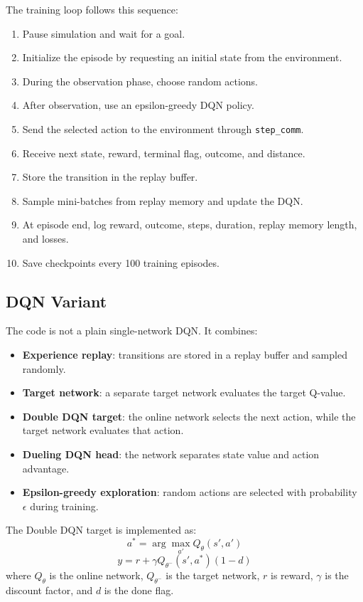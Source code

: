 \documentclass[11pt,a4paper]{article}
\begin{document}
The training loop follows this sequence:
\begin{enumerate}[noitemsep]
    \item Pause simulation and wait for a goal.
    \item Initialize the episode by requesting an initial state from the environment.
    \item During the observation phase, choose random actions.
    \item After observation, use an epsilon-greedy DQN policy.
    \item Send the selected action to the environment through \texttt{step\_comm}.
    \item Receive next state, reward, terminal flag, outcome, and distance.
    \item Store the transition in the replay buffer.
    \item Sample mini-batches from replay memory and update the DQN.
    \item At episode end, log reward, outcome, steps, duration, replay memory length, and losses.
    \item Save checkpoints every 100 training episodes.
\end{enumerate}

\subsection{DQN Variant}

The code is not a plain single-network DQN. It combines:
\begin{itemize}[noitemsep]
    \item \textbf{Experience replay}: transitions are stored in a replay buffer and sampled randomly.
    \item \textbf{Target network}: a separate target network evaluates the target Q-value.
    \item \textbf{Double DQN target}: the online network selects the next action, while the target network evaluates that action.
    \item \textbf{Dueling DQN head}: the network separates state value and action advantage.
    \item \textbf{Epsilon-greedy exploration}: random actions are selected with probability $\epsilon$ during training.
\end{itemize}

The Double DQN target is implemented as:
\[
    a^\ast = \arg\max_{a'} Q_{\theta}(s', a')
\]
\[
    y = r + \gamma Q_{\theta^-}(s', a^\ast)(1-d)
\]
where $Q_{\theta}$ is the online network, $Q_{\theta^-}$ is the target network, $r$ is reward, $\gamma$ is the discount factor, and $d$ is the done flag.
\end{document}

